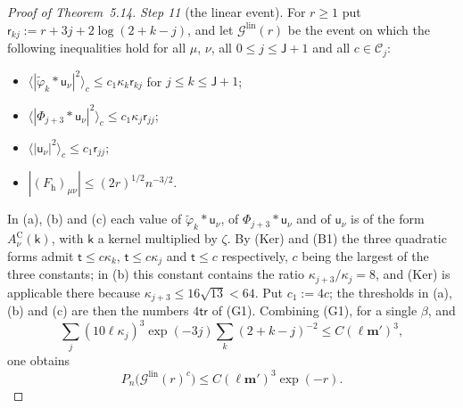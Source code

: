 \documentclass[11pt]{amsart}
\theoremstyle{definition}
\begin{document}
\begin{proof}[Proof of Theorem~5.14]
\emph{Step 11} (the linear event).
For $r\ge1$ put $\mathsf r_{kj}:=r+3j+2\log(2+k-j)$, and let $\mathcal G^{\mathrm{lin}}(r)$ be the event on which the following inequalities hold for all $\mu$, $\nu$, all $0\le j\le\mathsf J+1$ and all $c\in\mathcal C_j$:
\begin{itemize}
\item[(a)] $\langle|\tilde\varphi_k*\mathsf u_\nu|^2\rangle_c\le c_1\kappa_k\mathsf r_{kj}$ for $j\le k\le\mathsf J+1$;
\item[(b)] $\langle|\Phi_{j+3}*\mathsf u_\nu|^2\rangle_c\le c_1\kappa_j\mathsf r_{jj}$;
\item[(c)] $\langle|\mathsf u_\nu|^2\rangle_c\le c_1\mathsf r_{jj}$;
\item[(d)] $|(F_{\mathrm h})_{\mu\nu}|\le(2r)^{1/2}n^{-3/2}$.
\end{itemize}
In (a), (b) and (c) each value of $\tilde\varphi_k*\mathsf u_\nu$, of $\Phi_{j+3}*\mathsf u_\nu$ and of $\mathsf u_\nu$ is of the form $A^{\mathrm C}_\nu(\mathsf k)$, with $\mathsf k$ a kernel multiplied by $\zeta$.
By (Ker) and (B1) the three quadratic forms admit $\mathsf t\le c\kappa_k$, $\mathsf t\le c\kappa_j$ and $\mathsf t\le c$ respectively, $c$ being the largest of the three constants;
in (b) this constant contains the ratio $\kappa_{j+3}/\kappa_j=8$, and (Ker) is applicable there because $\kappa_{j+3}\le16\sqrt{13}<64$.
Put $c_1:=4c$;
the thresholds in (a), (b) and (c) are then the numbers $4\mathsf t\mathsf r$ of (G1).
Combining (G1), \cite[Theorem~6.27\,(c)]{QEDII} for a single $\beta$, and
\begin{equation*}
\sum_j(10\ell\kappa_j)^3\exp(-3j)\sum_k(2+k-j)^{-2}\le C(\ell\mathbf m')^3,
\end{equation*}
one obtains
\begin{equation*}
P_n\bigl(\mathcal G^{\mathrm{lin}}(r)^c\bigr)\le C(\ell\mathbf m')^3\exp(-r).
\end{equation*}


\end{proof}
\end{document}
